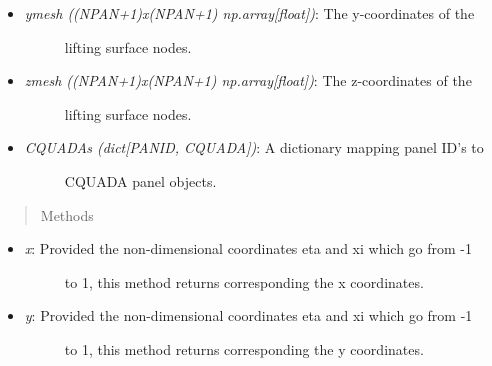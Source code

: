 \documentclass[letterpaper,10pt,english]{sphinxmanual}
\begin{document}
\begin{fulllineitems}
\begin{itemize}
\begin{description}
\end{description}

\item {} \begin{description}
\item[{\emph{ymesh ((NPAN+1)x(NPAN+1) np.array{[}float{]})}: The y-coordinates of the}] \leavevmode
lifting surface nodes.

\end{description}

\item {} \begin{description}
\item[{\emph{zmesh ((NPAN+1)x(NPAN+1) np.array{[}float{]})}: The z-coordinates of the}] \leavevmode
lifting surface nodes.

\end{description}

\item {} \begin{description}
\item[{\emph{CQUADAs (dict{[}PANID, CQUADA{]})}: A dictionary mapping panel ID's to}] \leavevmode
CQUADA panel objects.

\end{description}

\end{itemize}
\begin{quote}\begin{description}
\item[{Methods}] \leavevmode
\end{description}\end{quote}
\begin{itemize}
\item {} \begin{description}
\item[{\emph{x}: Provided the non-dimensional coordinates eta and xi which go from -1}] \leavevmode
to 1, this method returns corresponding the x coordinates.

\end{description}

\item {} \begin{description}
\item[{\emph{y}: Provided the non-dimensional coordinates eta and xi which go from -1}] \leavevmode
to 1, this method returns corresponding the y coordinates.

\end{description}


\end{itemize}
\end{fulllineitems}
\end{document}
